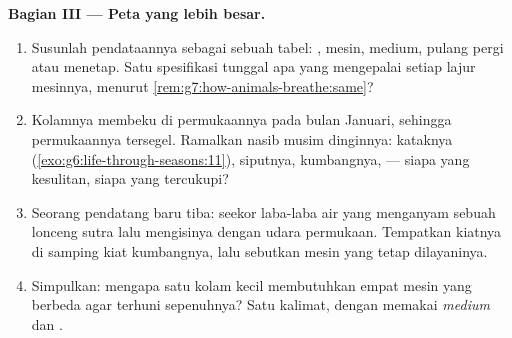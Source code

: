 \begin{problem}
\medskip\noindent\textbf{Bagian III --- Peta yang lebih besar.}
\begin{enumerate}[resume]
  \item Susunlah pendataannya sebagai sebuah tabel: , mesin,
        medium, pulang pergi atau menetap. Satu spesifikasi tunggal apa
        yang mengepalai setiap lajur mesinnya, menurut
        \cref{rem:g7:how-animals-breathe:same}?
  \item Kolamnya membeku di permukaannya pada bulan Januari, sehingga
        permukaannya tersegel. Ramalkan nasib musim dinginnya:
        kataknya (\cref{exo:g6:life-through-seasons:11}), siputnya,
        kumbangnya,  --- siapa yang kesulitan, siapa yang
        tercukupi?
  \item Seorang pendatang baru tiba: seekor laba-laba air yang menganyam
        sebuah lonceng sutra lalu mengisinya dengan udara permukaan.
        Tempatkan kiatnya di samping kiat kumbangnya, lalu sebutkan
        mesin yang tetap dilayaninya.
  \item Simpulkan: mengapa satu kolam kecil membutuhkan empat mesin
         yang berbeda agar terhuni sepenuhnya? Satu kalimat,
        dengan memakai \emph{medium} dan \emph{}.
\end{enumerate}
\end{problem}
